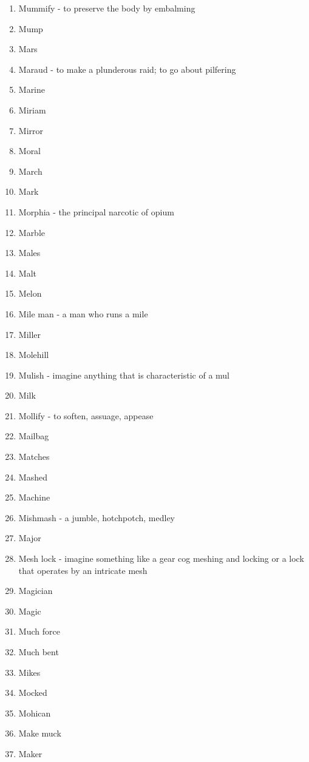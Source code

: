 \begin{enumerate}
        \item Mummify - to preserve the body by embalming
        \item Mump
        \item Mars
        \item Maraud - to make a plunderous raid; to go about pilfering
        \item Marine
        \item Miriam
        \item Mirror
        \item Moral
        \item March
        \item Mark
        \item Morphia - the principal narcotic of opium
        \item Marble
        \item Males
        \item Malt
        \item Melon
        \item Mile man - a man who runs a mile
        \item Miller
        \item Molehill
        \item Mulish - imagine anything that is characteristic of a mul
        \item Milk
        \item Mollify - to soften, assuage, appease
        \item Mailbag
        \item Matches
        \item Mashed
        \item Machine
        \item Mishmash - a jumble, hotchpotch, medley
        \item Major
        \item Mesh lock - imagine something like a gear cog meshing and locking or a lock that operates by an intricate mesh
        \item Magician
        \item Magic
        \item Much force
        \item Much bent
        \item Mikes
        \item Mocked
        \item Mohican
        \item Make muck
        \item Maker

\end{enumerate}
